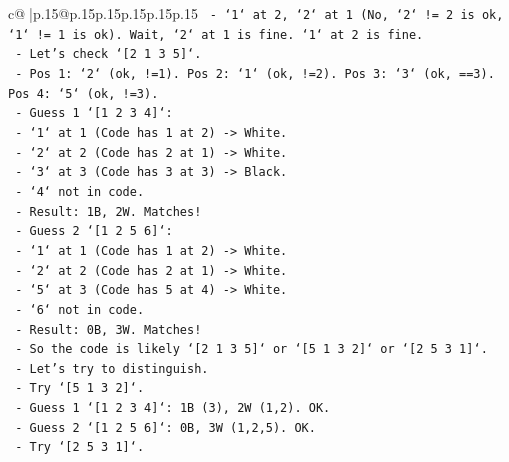 \documentclass{article}
\begin{document}
{\begin{supertabular}{c@{$\;$}|p{.15\linewidth}@{}p{.15\linewidth}p{.15\linewidth}p{.15\linewidth}p{.15\linewidth}p{.15\linewidth}}
{{{\texttt{                            {-} `1` at 2, `2` at 1 (No, `2` != 2 is ok, `1` != 1 is ok). Wait, `2` at 1 is fine. `1` at 2 is fine.} \\
\texttt{                            {-} Let's check `{[}2 1 3 5{]}`.} \\
\texttt{                                {-} Pos 1: `2` (ok, !=1). Pos 2: `1` (ok, !=2). Pos 3: `3` (ok, ==3). Pos 4: `5` (ok, !=3).} \\
\texttt{                                {-} Guess 1 `{[}1 2 3 4{]}`:} \\
\texttt{                                    {-} `1` at 1 (Code has 1 at 2) {-}> White.} \\
\texttt{                                    {-} `2` at 2 (Code has 2 at 1) {-}> White.} \\
\texttt{                                    {-} `3` at 3 (Code has 3 at 3) {-}> Black.} \\
\texttt{                                    {-} `4` not in code.} \\
\texttt{                                    {-} Result: 1B, 2W. Matches!} \\
\texttt{                                {-} Guess 2 `{[}1 2 5 6{]}`:} \\
\texttt{                                    {-} `1` at 1 (Code has 1 at 2) {-}> White.} \\
\texttt{                                    {-} `2` at 2 (Code has 2 at 1) {-}> White.} \\
\texttt{                                    {-} `5` at 3 (Code has 5 at 4) {-}> White.} \\
\texttt{                                    {-} `6` not in code.} \\
\texttt{                                    {-} Result: 0B, 3W. Matches!} \\
\texttt{                    {-} So the code is likely `{[}2 1 3 5{]}` or `{[}5 1 3 2{]}` or `{[}2 5 3 1{]}`.} \\
\texttt{                    {-} Let's try to distinguish.} \\
\texttt{                    {-} Try `{[}5 1 3 2{]}`.} \\
\texttt{                        {-} Guess 1 `{[}1 2 3 4{]}`: 1B (3), 2W (1,2). OK.} \\
\texttt{                        {-} Guess 2 `{[}1 2 5 6{]}`: 0B, 3W (1,2,5). OK.} \\
\texttt{                    {-} Try `{[}2 5 3 1{]}`.} \\
}}}
\end{supertabular}}
\end{document}
